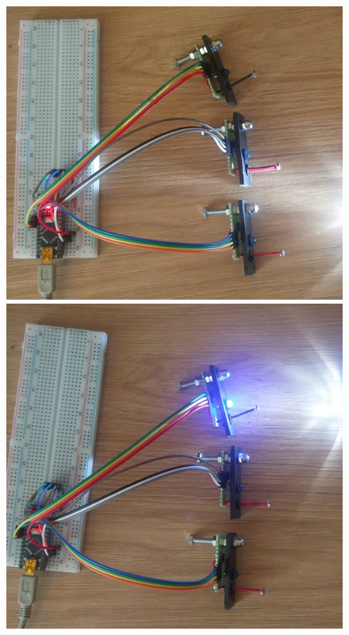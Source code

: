 \documentclass[a4paper,12pt]{article}
\begin{document}
\begin{figure}[htp]
    \centering
    \begin{minipage}{0.32\textwidth}
        \centering
        \includegraphics[width=\linewidth]{images/vm_test_1.png}
    \end{minipage}\hfill
    \begin{minipage}{0.32\textwidth}
        \centering
        \includegraphics[width=\linewidth]{images/vm_test_2.png}

\end{minipage}
\end{figure}
\end{document}
